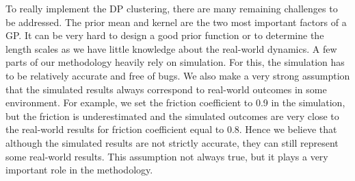 \documentclass[journal]{IEEEtran}
\begin{document}
To really implement the DP clustering, there are many remaining challenges to be addressed.
The prior mean and kernel are the two most important factors of a GP.
It can be very hard to design a good prior function or to determine the length scales as we have little knowledge about the real-world dynamics.
A few parts of our methodology heavily rely on simulation.
For this, the simulation has to be relatively accurate and free of bugs.
We also make a very strong assumption that the simulated results always correspond to real-world outcomes in some environment. 
For example, we set the friction coefficient to 0.9 in the simulation, but the friction is underestimated and the simulated outcomes are very close to the real-world results for friction coefficient equal to 0.8.
Hence we believe that although the simulated results are not strictly accurate, they can still represent some real-world results.
This assumption not always true, but it plays a very important role in the methodology.


\end{document}
